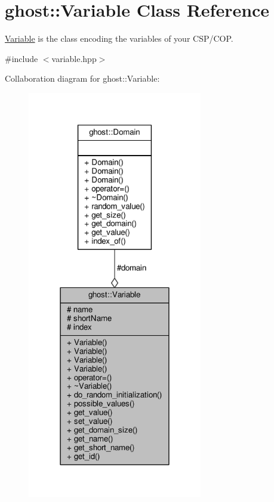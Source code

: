 \hypertarget{classghost_1_1Variable}{}\section{ghost\+:\+:Variable Class Reference}
\label{classghost_1_1Variable}


\hyperlink{classghost_1_1Variable}{Variable} is the class encoding the variables of your C\+S\+P/\+C\+OP.  




{\ttfamily \#include $<$variable.\+hpp$>$}



Collaboration diagram for ghost\+:\+:Variable\+:
\nopagebreak
\begin{figure}[H]
\begin{center}
\leavevmode
\includegraphics[width=216pt]{classghost_1_1Variable__coll__graph}
\end{center}
\end{figure}
